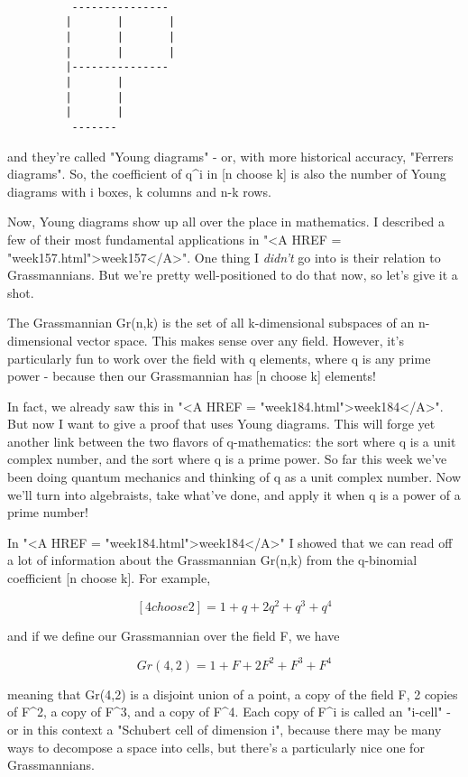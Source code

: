 \begin{verbatim}

          ---------------
         |       |       |
         |       |       |
         |       |       |
         |---------------
         |       |       
         |       |       
         |       |       
          -------
\end{verbatim}
    

and they're called "Young diagrams" - or, with more historical
accuracy, "Ferrers diagrams".  So, the coefficient of q^i in
[n choose k] is also the number of Young diagrams with i boxes, k
columns and n-k rows.

Now, Young diagrams show up all over the place in mathematics.  I
described a few of their most fundamental applications in "<A HREF
= "week157.html">week157</A>".  One thing I \emph{didn't} go into is
their relation to Grassmannians.  But we're pretty well-positioned to do
that now, so let's give it a shot.

The Grassmannian Gr(n,k) is the set of all k-dimensional subspaces 
of an n-dimensional vector space.  This makes sense over any field.
However, it's particularly fun to work over the field with q elements, 
where q is any prime power - because then our Grassmannian has [n choose k] 
elements!  

In fact, we already saw this in "<A HREF =
"week184.html">week184</A>".  But now I want to give a proof that
uses Young diagrams.  This will forge yet another link between the two
flavors of q-mathematics: the sort where q is a unit complex number, and
the sort where q is a prime power.  So far this week we've been doing
quantum mechanics and thinking of q as a unit complex number.  Now we'll
turn into algebraists, take what've done, and apply it when q is a power
of a prime number!

In "<A HREF = "week184.html">week184</A>" I showed that we can
read off a lot of information about the Grassmannian Gr(n,k) from the
q-binomial coefficient [n choose k].  For example,


$$

[4 choose 2] = 1 + q + 2q^{2} + q^{3} + q^{4}
$$
    
and if we define our Grassmannian over the field F, we have

$$

     Gr(4,2) = 1 + F + 2F^{2} + F^{3} + F^{4}

$$
    
meaning that Gr(4,2) is a disjoint union of a point, a copy of the field
F, 2 copies of F^{2}, a copy of F^{3}, and a copy of
F^{4}.  Each copy of F^{i} is called an
"i-cell" - or in this context a "Schubert cell of
dimension i", because there may be many ways to decompose a space
into cells, but there's a particularly nice one for Grassmannians.

